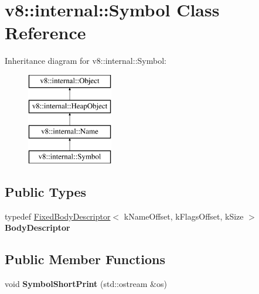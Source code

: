 \hypertarget{classv8_1_1internal_1_1_symbol}{}\section{v8\+:\+:internal\+:\+:Symbol Class Reference}
\label{classv8_1_1internal_1_1_symbol}
Inheritance diagram for v8\+:\+:internal\+:\+:Symbol\+:\begin{figure}[H]
\begin{center}
\leavevmode
\includegraphics[height=4.000000cm]{classv8_1_1internal_1_1_symbol}
\end{center}
\end{figure}
\subsection*{Public Types}
\begin{DoxyCompactItemize}
\item 
typedef \hyperlink{classv8_1_1internal_1_1_fixed_body_descriptor}{Fixed\+Body\+Descriptor}$<$ k\+Name\+Offset, k\+Flags\+Offset, k\+Size $>$ {\bfseries Body\+Descriptor}\hypertarget{classv8_1_1internal_1_1_symbol_a626f7958735462e79153ef0e34976555}{}\label{classv8_1_1internal_1_1_symbol_a626f7958735462e79153ef0e34976555}

\end{DoxyCompactItemize}
\subsection*{Public Member Functions}
\begin{DoxyCompactItemize}
\item 
void {\bfseries Symbol\+Short\+Print} (std\+::ostream \&os)\hypertarget{classv8_1_1internal_1_1_symbol_adfba548a4d8b7b609f8a8031f42bc45a}{}\label{classv8_1_1internal_1_1_symbol_adfba548a4d8b7b609f8a8031f42bc45a}

\end{DoxyCompactItemize}
